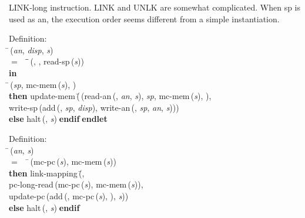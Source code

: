  LINK-long instruction.
 LINK and UNLK are somewhat complicated.  When sp is used as an,  the
 execution order seems different from a simple instantiation.
\begin{tabbing}{\sc Definition}: \\  
\=\,({\it{an\/}}, {\it{disp\/}}, {\it{s\/}}) \\ 
$=$$\;\;\;\;$\=\=\,({}, {}, {\rm{read-sp}}\,({\it{s\/}}))\- \\ 
{\bf in} \\ 
\=\,({\it{sp\/}}, {\rm{mc-mem}}\,({\it{s\/}}), {}) \\ 
{\bf then }{\rm{update-mem}}\,(\=\,({\rm{read-an}}\,({}, {\it{an\/}}, {\it{s\/}}), {\it{sp\/}}, {\rm{mc-mem}}\,({\it{s\/}}), {}), \\ 
{\rm{write-sp}}\,({\rm{add}}\,({}, {\it{sp\/}}, {\it{disp\/}}), {\rm{write-an}}\,({}, {\it{sp\/}}, {\it{an\/}}, {\it{s\/}})))\- \\ 
{\bf else }{\rm{halt}}\,({}, {\it{s\/}})$\;${\bf  endif}\-$\;${\bf  endlet}\-\-
\end{tabbing}

\begin{tabbing}{\sc Definition}: \\  
\=\,({\it{an\/}}, {\it{s\/}}) \\ 
$=$$\;\;\;\;$\=\,({\rm{mc-pc}}\,({\it{s\/}}), {\rm{mc-mem}}\,({\it{s\/}})) \\ 
{\bf then }{\rm{link-mapping}}\,(\=, \\ 
{\rm{pc-long-read}}\,({\rm{mc-pc}}\,({\it{s\/}}), {\rm{mc-mem}}\,({\it{s\/}})), \\ 
{\rm{update-pc}}\,({\rm{add}}\,({}, {\rm{mc-pc}}\,({\it{s\/}}), {}), {\it{s\/}}))\- \\ 
{\bf else }{\rm{halt}}\,({}, {\it{s\/}})$\;${\bf  endif}\-\-
\end{tabbing}

